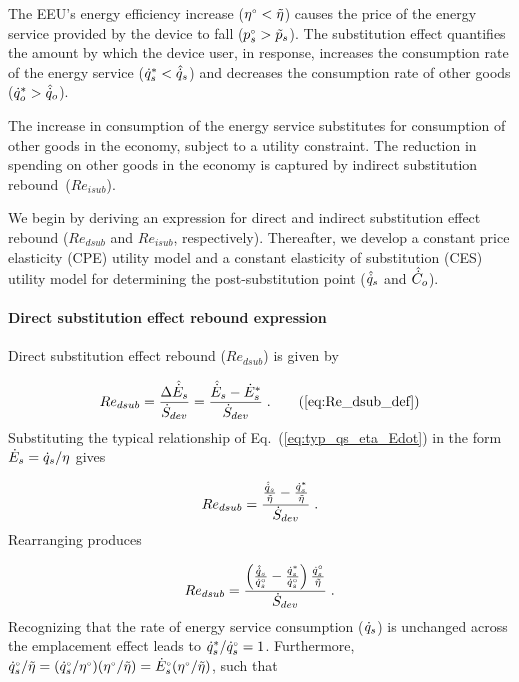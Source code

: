 The EEU's energy efficiency increase
(${}{\eta}^{\scriptscriptstyle \circ} < \tilde{\eta}$)
causes the price of the energy service provided by the device to fall
(${}{p}^{\scriptscriptstyle \circ}_s > \tilde{p}_s$).
The substitution effect quantifies the amount by which
the device user, in response,
increases the consumption rate of the energy service 
(${\dot{q}}^*_s < \hat{\dot{q}}_s$) 
and decreases the consumption rate of other goods 
(${\dot{q}}^*_o > \hat{\dot{q}}_o$).

The increase in consumption of the energy service 
substitutes for consumption of other goods in the economy,
subject to a utility constraint.
The reduction in spending on other goods in the economy
is captured by indirect substitution rebound~($Re_{isub}$).

We begin by deriving an expression for direct and indirect 
substitution effect rebound ($Re_{dsub}$ and $Re_{isub}$, respectively).
Thereafter, we develop 
a constant price elasticity (CPE) utility model and
a constant elasticity of substitution (CES) utility model
for determining the 
post-substitution point ($\hat{\dot{q}}_s$ and $\hat{\dot{C}}_o$).


\paragraph{Direct substitution effect rebound expression}
\label{sec:Redsub_expression}

Direct substitution effect rebound ($Re_{dsub}$) is given by

\begin{equation}
  Re_{dsub} = \frac{\Delta \rasub{E}_s}{\Sdot} = \frac{\rasub{E}_s - \rbsub{E}_s}{\Sdot} \; . \tag{\ref{eq:Re_dsub_def}}
\end{equation}
%
Substituting the typical relationship of Eq.~(\ref{eq:typ_qs_eta_Edot})
in the form $\dot{E}_s = \dot{q}_s/\eta$ gives

\begin{equation}
  Re_{dsub} = \frac{\frac{\hat{\dot{q}}_s}{\tilde{\eta}} - \frac{{\dot{q}}^*_s}{\tilde{\eta}}}{\dot{S}_{dev}} \; .
\end{equation}
%
Rearranging produces

\begin{equation}
  Re_{dsub} = \frac{ \left( \frac{\hat{\dot{q}}_s}{{}{\dot{q}}^{\scriptscriptstyle \circ}_s}
                    - \frac{{\dot{q}}^*_s}{{}{\dot{q}}^{\scriptscriptstyle \circ}_s}  \right) \frac{{}{\dot{q}}^{\scriptscriptstyle \circ}_s}{\tilde{\eta}} }{\dot{S}_{dev}} \; .
\end{equation}
%
Recognizing that the rate of energy service consumption ($\dot{q}_s$)
is unchanged across the emplacement effect leads to ${\dot{q}}^*_s/{}{\dot{q}}^{\scriptscriptstyle \circ}_s = 1$.
Furthermore, ${}{\dot{q}}^{\scriptscriptstyle \circ}_s/\tilde{\eta}
            = ({}{\dot{q}}^{\scriptscriptstyle \circ}_s/{}{\eta}^{\scriptscriptstyle \circ}) ({}{\eta}^{\scriptscriptstyle \circ}/\tilde{\eta})
            = {}{\dot{E}}^{\scriptscriptstyle \circ}_s ({}{\eta}^{\scriptscriptstyle \circ}/\tilde{\eta})$,
such that

